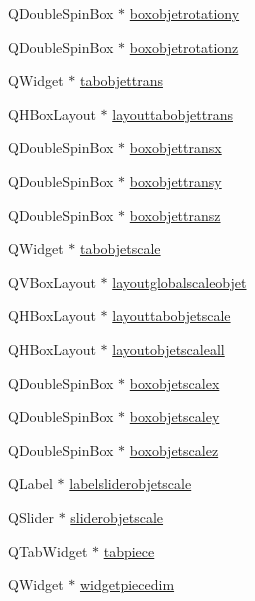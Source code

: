 \begin{DoxyCompactItemize}
\item 
Q\+Double\+Spin\+Box $\ast$ \hyperlink{class_mondock_aeeea985e7f23ebf81696648d8e0dea40}{boxobjetrotationy}
\item 
Q\+Double\+Spin\+Box $\ast$ \hyperlink{class_mondock_af722379e41c8ebc43f6068754564aa4f}{boxobjetrotationz}
\item 
Q\+Widget $\ast$ \hyperlink{class_mondock_a8eee5e642f5cb6d30635c80417576622}{tabobjettrans}
\item 
Q\+H\+Box\+Layout $\ast$ \hyperlink{class_mondock_a1776a6148557d83c98a8a05368c08eef}{layouttabobjettrans}
\item 
Q\+Double\+Spin\+Box $\ast$ \hyperlink{class_mondock_a906d6de66e15f9b964d68947ac8ee94e}{boxobjettransx}
\item 
Q\+Double\+Spin\+Box $\ast$ \hyperlink{class_mondock_a15ed0b5c13500bfad6a2b5289c5a3ddf}{boxobjettransy}
\item 
Q\+Double\+Spin\+Box $\ast$ \hyperlink{class_mondock_ab0102fb06cf68a8c70fed13550b4dcb6}{boxobjettransz}
\item 
Q\+Widget $\ast$ \hyperlink{class_mondock_a2463c02b8f4ff3f1ff23f2f72e3c0f48}{tabobjetscale}
\item 
Q\+V\+Box\+Layout $\ast$ \hyperlink{class_mondock_a376d034b08d180ee9d91ab0c5826a5d8}{layoutglobalscaleobjet}
\item 
Q\+H\+Box\+Layout $\ast$ \hyperlink{class_mondock_a7337ba165d8f7543e3469a2a25f3f062}{layouttabobjetscale}
\item 
Q\+H\+Box\+Layout $\ast$ \hyperlink{class_mondock_a4adea363f864aeaa15cbf636dca8f4cc}{layoutobjetscaleall}
\item 
Q\+Double\+Spin\+Box $\ast$ \hyperlink{class_mondock_a0300855d7d2e07ff9f29acfe6aabf86a}{boxobjetscalex}
\item 
Q\+Double\+Spin\+Box $\ast$ \hyperlink{class_mondock_a111e6d0603d220eafef5fe6754ee5686}{boxobjetscaley}
\item 
Q\+Double\+Spin\+Box $\ast$ \hyperlink{class_mondock_a23022e2424b108b94b9519167b702b2a}{boxobjetscalez}
\item 
Q\+Label $\ast$ \hyperlink{class_mondock_a1536ab110ce2aff8fc022ccf80ee0cff}{labelsliderobjetscale}
\item 
Q\+Slider $\ast$ \hyperlink{class_mondock_a46bd66f14e79aed16f26a9475640fcbd}{sliderobjetscale}
\item 
Q\+Tab\+Widget $\ast$ \hyperlink{class_mondock_a5985ccaca36a0e545e6e74a84623b1a9}{tabpiece}
\item 
Q\+Widget $\ast$ \hyperlink{class_mondock_abe21ad30be63590c6ce6e18969e9f082}{widgetpiecedim}

\end{DoxyCompactItemize}
